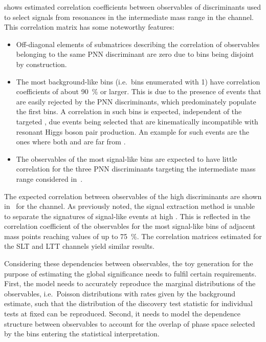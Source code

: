  shows estimated correlation
coefficients between observables of discriminants used to select signals from
resonances in the intermediate mass range in the \hadhad channel. This
correlation matrix has some noteworthy features:
\begin{itemize}
\item Off-diagonal elements of submatrices describing the correlation of
  observables belonging to the same PNN discriminant are zero due to bins being
  disjoint by construction.

\item The most background-like bins (i.e.\ bins enumerated with 1) have
  correlation coefficients of about \SI{90}{\percent} or larger. This is due to
  the presence of events that are easily rejected by the PNN discriminants,
  which predominately populate the first bins. A correlation in such bins is
  expected, independent of the targeted \mX, due events being selected that are
  kinematically incompatible with resonant Higgs boson pair production. An
  example for such events are the ones where both \mMMC and \mBB are far from
  \mH.

\item The observables of the most signal-like bins are expected to have little
  correlation for the three PNN discriminants targeting the intermediate mass
  range considered in~.
\end{itemize}

The expected correlation between observables of the high \mX discriminants are
shown in~ for the \hadhad
channel. As previously noted, the signal extraction method is unable to separate
the signatures of signal-like events at high \mX. This is reflected in the
correlation coefficient of the observables for the most signal-like bins of
adjacent mass points reaching values of up to \SI{75}{\percent}. The correlation
matrices estimated for the \lephad SLT and LTT channels yield similar
results.

Considering these dependencies between observables, the toy generation for the
purpose of estimating the global significance needs to fulfil certain
requirements. First, the model needs to accurately reproduce the marginal
distributions of the observables, i.e.\ Poisson distributions with rates given
by the background estimate, such that the distribution of the discovery test
statistic for individual tests at fixed \mX can be reproduced. Second, it needs
to model the dependence structure between observables to account for the overlap
of phase space selected by the bins entering the statistical interpretation.

